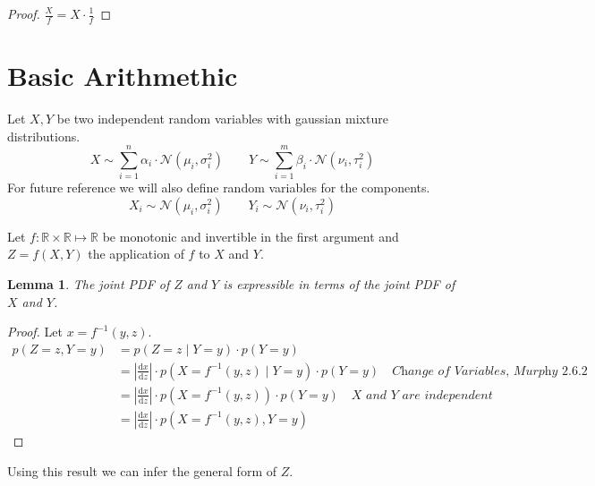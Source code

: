 \documentclass[11pt,a4paper]{report}
\newtheorem{lemma}{Lemma}
\begin{document}
\begin{proof}
  $\frac{X}{f} = X \cdot \frac{1}{f}$
\end{proof}

\section{Basic Arithmethic}

Let $X, Y$ be two independent random variables with gaussian mixture
distributions.
\begin{equation*}
  X \sim \sum_{i = 1}^{n} \alpha_{i} \cdot \mathcal{N}(\mu_{i}, \sigma_{i}^{2}) \qquad Y \sim \sum_{i = 1}^{m} \beta_{i} \cdot \mathcal{N}(\nu_{i}, \tau_{i}^{2})
\end{equation*}
For future reference we will also define random variables for the components.
\begin{equation*}
  X_{i} \sim \mathcal{N}(\mu_{i}, \sigma_{i}^{2}) \qquad Y_{i} \sim \mathcal{N}(\nu_{i}, \tau_{i}^{2})
\end{equation*}

Let $f : \mathbb{R} \times \mathbb{R} \mapsto \mathbb{R}$ be monotonic and
invertible in the first argument and $Z = f(X, Y)$ the application of $f$ to $X$
and $Y$.

\begin{lemma}
  The joint PDF of $Z$ and $Y$ is expressible in terms of the joint PDF of $X$
  and $Y$.
\end{lemma}
\begin{proof}
  Let $x = f^{-1}(y, z)$.
  \begin{align*}
    p(Z = z, Y = y) & = p(Z = z \mid Y = y) \cdot p(Y = y)\\
                    & = \left| \frac{\mathrm{d}x}{\mathrm{d}z} \right| \cdot p(X = f^{-1}(y, z) \mid Y = y) \cdot p(Y = y) \quad\textit{Change of Variables, Murphy 2.6.2}\\
                    & = \left| \frac{\mathrm{d}x}{\mathrm{d}z} \right| \cdot p(X = f^{-1}(y, z)) \cdot p(Y = y) \quad\textit{$X$ and $Y$ are independent}\\
                    & = \left| \frac{\mathrm{d}x}{\mathrm{d}z} \right| \cdot p(X = f^{-1}(y, z), Y = y)
  \end{align*}
\end{proof}

Using this result we can infer the general form of $Z$.
\end{document}
